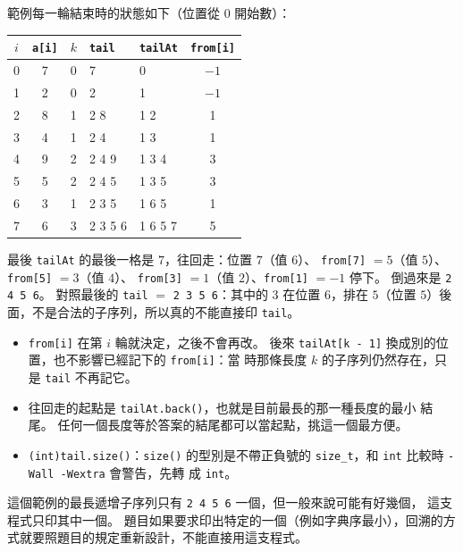 
範例每一輪結束時的狀態如下（位置從 $0$ 開始數）：

\begin{center}
\begin{tabular}{cccllc}
\toprule
$i$ & \texttt{a[i]} & $k$ & \texttt{tail} & \texttt{tailAt} & \texttt{from[i]} \\
\midrule
0 & 7 & 0 & 7 & 0 & $-1$ \\
1 & 2 & 0 & 2 & 1 & $-1$ \\
2 & 8 & 1 & 2 8 & 1 2 & 1 \\
3 & 4 & 1 & 2 4 & 1 3 & 1 \\
4 & 9 & 2 & 2 4 9 & 1 3 4 & 3 \\
5 & 5 & 2 & 2 4 5 & 1 3 5 & 3 \\
6 & 3 & 1 & 2 3 5 & 1 6 5 & 1 \\
7 & 6 & 3 & 2 3 5 6 & 1 6 5 7 & 5 \\
\bottomrule
\end{tabular}
\end{center}

最後 \texttt{tailAt} 的最後一格是 $7$，往回走：位置 $7$（值 $6$）、
\texttt{from[7]} $= 5$（值 $5$）、\texttt{from[5]} $= 3$（值 $4$）、
\texttt{from[3]} $= 1$（值 $2$）、\texttt{from[1]} $= -1$ 停下。 倒過來是
\texttt{2 4 5 6}。 對照最後的 \texttt{tail} $=$ \texttt{2 3 5 6}：其中的 $3$
在位置 $6$，排在 $5$（位置 $5$）後面，不是合法的子序列，所以真的不能直接印
\texttt{tail}。

\begin{itemize}
\item \texttt{from[i]} 在第 $i$ 輪就決定，之後不會再改。 後來
\texttt{tailAt[k - 1]} 換成別的位置，也不影響已經記下的 \texttt{from[i]}：當
時那條長度 $k$ 的子序列仍然存在，只是 \texttt{tail} 不再記它。
\item 往回走的起點是 \texttt{tailAt.back()}，也就是目前最長的那一種長度的最小
結尾。 任何一個長度等於答案的結尾都可以當起點，挑這一個最方便。
\item \texttt{(int)tail.size()}：\texttt{size()} 的型別是不帶正負號的
\texttt{size\_t}，和 \texttt{int} 比較時 \texttt{-Wall -Wextra} 會警告，先轉
成 \texttt{int}。
\end{itemize}

這個範例的最長遞增子序列只有 \texttt{2 4 5 6} 一個，但一般來說可能有好幾個，
這支程式只印其中一個。 題目如果要求印出特定的一個（例如字典序最小），回溯的方
式就要照題目的規定重新設計，不能直接用這支程式。

